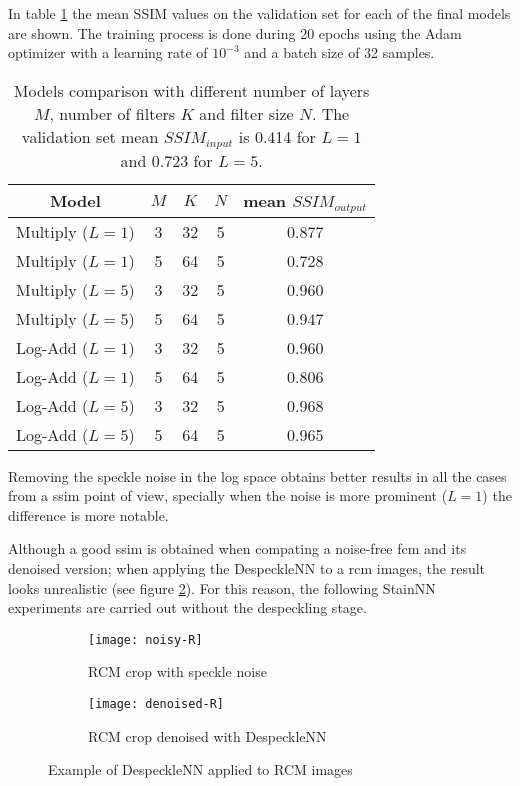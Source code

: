 \documentclass[../main.tex]{subfiles}
\begin{document}
In table \ref{tab:despeckling} the mean SSIM values on the validation set
for each of the final models are shown. The training process is done during
20 epochs using the Adam optimizer with a learning rate of $10^{-3}$ and a
batch size of 32 samples.

\begin{table}
\centering
\begin{tabular}{*5c}
\toprule
Model & $M$ & $K$ & $N$ & mean $SSIM_{output}$ \\
\midrule
Multiply ($L = 1$) & 3 & 32 & 5 & 0.877 \\
Multiply ($L = 1$) & 5 & 64 & 5 & 0.728 \\
Multiply ($L = 5$) & 3 & 32 & 5 & 0.960 \\
Multiply ($L = 5$) & 5 & 64 & 5 & 0.947 \\

Log-Add ($L = 1$) & 3 & 32 & 5 & 0.960 \\
Log-Add ($L = 1$) & 5 & 64 & 5 & 0.806 \\
Log-Add ($L = 5$) & 3 & 32 & 5 & 0.968 \\
Log-Add ($L = 5$) & 5 & 64 & 5 & 0.965 \\
\bottomrule
\end{tabular}
\caption{Models comparison with different number of layers $M$, number
of filters $K$ and filter size $N$. The validation set mean $SSIM_{input}$
is 0.414 for $L=1$ and 0.723 for $L=5$.}
\label{tab:despeckling}
\end{table}

Removing the speckle noise in the log space obtains better results in all
the cases from a \gls{ssim} point of view, specially when the noise is
more prominent ($L = 1$) the difference is more notable.

Although a good \gls{ssim} is obtained when compating a noise-free \gls{fcm}
and its denoised version; when applying the DespeckleNN to a \gls{rcm} images,
the result looks unrealistic (see figure \ref{fig:denoised-R}).
For this reason, the following StainNN experiments are carried out without the
despeckling stage.

\begin{figure}[H]
\centering
\begin{subfigure}{.5\textwidth}
  \centering
  \texttt{[image: noisy-R]}
  \caption{RCM crop with speckle noise}
  \label{fig:noisy-R}
\end{subfigure}%
\begin{subfigure}{.5\textwidth}
  \centering
  \texttt{[image: denoised-R]}
  \caption{RCM crop denoised with DespeckleNN}
  \label{fig:denoised-R}
\end{subfigure}
\caption{Example of DespeckleNN applied to RCM images}
\label{}
\end{figure}
\end{document}
